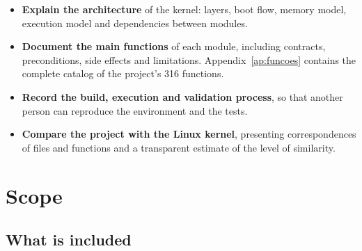 \begin{itemize}
  \item \textbf{Explain the architecture} of the kernel: layers, boot flow,
        memory model, execution model and dependencies between modules.
  \item \textbf{Document the main functions} of each module, including
        contracts, preconditions, side effects and limitations.
        Appendix~\ref{ap:funcoes} contains the complete catalog of the
        project's 316 functions.
  \item \textbf{Record the build, execution and validation process}, so that
        another person can reproduce the environment and the tests.
  \item \textbf{Compare the project with the Linux kernel}, presenting
        correspondences of files and functions and a transparent estimate of
        the level of similarity.
\end{itemize}

\section{Scope}

\subsection*{What is included}

